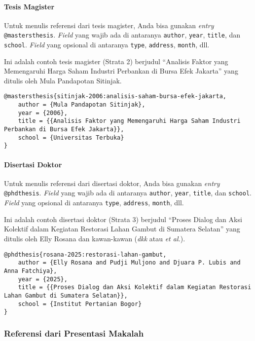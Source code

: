\paragraph{Tesis Magister}

Untuk menulis referensi dari tesis magister, Anda bisa gunakan \textit{entry} \texttt{@mastersthesis}. \textit{Field} yang wajib ada di antaranya \texttt{author}, \texttt{year}, \texttt{title}, dan \texttt{school}. \textit{Field} yang opsional di antaranya \texttt{type}, \texttt{address}, \texttt{month}, dll.

Ini adalah contoh tesis magister (Strata 2) berjudul ``Analisis Faktor yang Memengaruhi Harga Saham Industri Perbankan di Bursa Efek Jakarta'' yang ditulis oleh Mula Pandapotan Sitinjak.

\begin{lstlisting}
@mastersthesis{sitinjak-2006:analisis-saham-bursa-efek-jakarta,
    author = {Mula Pandapotan Sitinjak},
    year = {2006},
    title = {{Analisis Faktor yang Memengaruhi Harga Saham Industri Perbankan di Bursa Efek Jakarta}},
    school = {Universitas Terbuka}
}
\end{lstlisting}

\paragraph{Disertasi Doktor}

Untuk menulis referensi dari disertasi doktor, Anda bisa gunakan \textit{entry} \texttt{@phdthesis}. \textit{Field} yang wajib ada di antaranya \texttt{author}, \texttt{year}, \texttt{title}, dan \texttt{school}. \textit{Field} yang opsional di antaranya \texttt{type}, \texttt{address}, \texttt{month}, dll.

Ini adalah contoh disertasi doktor (Strata 3) berjudul ``Proses Dialog dan Aksi Kolektif dalam Kegiatan Restorasi Lahan Gambut di Sumatera Selatan'' yang ditulis oleh Elly Rosana dan kawan-kawan (\textit{dkk} atau \textit{et al.}).

\begin{lstlisting}
@phdthesis{rosana-2025:restorasi-lahan-gambut,
    author = {Elly Rosana and Pudji Muljono and Djuara P. Lubis and Anna Fatchiya},
    year = {2025},
    title = {{Proses Dialog dan Aksi Kolektif dalam Kegiatan Restorasi Lahan Gambut di Sumatera Selatan}},
    school = {Institut Pertanian Bogor}
}
\end{lstlisting}

\subsubsection{Referensi dari Presentasi Makalah}

